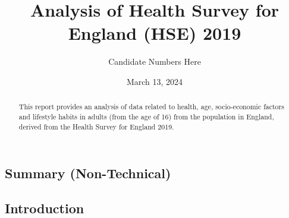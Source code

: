 \documentclass[
  11pt,
]{article}
\title{Analysis of Health Survey for England (HSE) 2019}
\author{Candidate Numbers Here}
\date{March 13, 2024}
\begin{document}
\maketitle
\begin{abstract}
This report provides an analysis of data related to health, age,
socio-economic factors and lifestyle habits in adults (from the age of
16) from the population in England, derived from the Health Survey for
England 2019.
\end{abstract}


\newpage

\subsection{Summary (Non-Technical)}\label{summary-non-technical}

\subsection{Introduction}\label{introduction}
\end{document}
